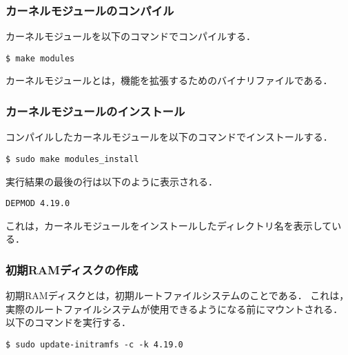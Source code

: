 \documentclass[12pt]{jsarticle}
\begin{document}
\subsubsection{カーネルモジュールのコンパイル}
カーネルモジュールを以下のコマンドでコンパイルする．
\begin{verbatim}
$ make modules
\end{verbatim}
カーネルモジュールとは，機能を拡張するためのバイナリファイルである．

\subsubsection{カーネルモジュールのインストール}
コンパイルしたカーネルモジュールを以下のコマンドでインストールする．
\begin{verbatim}
$ sudo make modules_install
\end{verbatim}
実行結果の最後の行は以下のように表示される．
\begin{verbatim}
DEPMOD 4.19.0
\end{verbatim}
これは，カーネルモジュールをインストールしたディレクトリ名を表示している．

\subsubsection{初期RAMディスクの作成}
初期RAMディスクとは，初期ルートファイルシステムのことである．
これは，実際のルートファイルシステムが使用できるようになる前にマウントされる．
以下のコマンドを実行する．
\begin{verbatim}
$ sudo update-initramfs -c -k 4.19.0
\end{verbatim}
\end{document}
